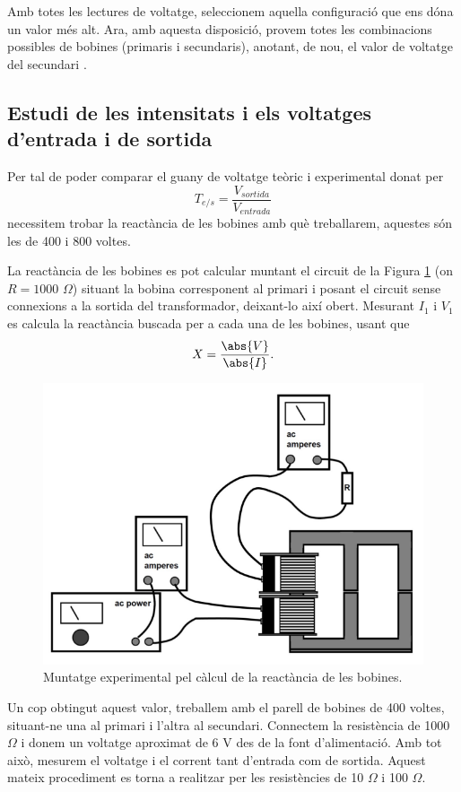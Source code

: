 \documentclass[a4paper,10.5pt]{report}
\begin{document}
Amb totes les lectures de voltatge, seleccionem aquella configuració que ens dóna un valor més alt. Ara, amb aquesta disposició, provem totes les combinacions possibles de bobines (primaris i secundaris), anotant, de nou, el valor de voltatge del secundari .

\subsection{Estudi de les intensitats i els voltatges d'entrada i de sortida}
Per tal de poder comparar el guany de voltatge teòric i experimental donat per
\begin{equation}
	T_{e/s}=\frac{V_{sortida}}{V_{entrada}}
	\label{eq4:25}
\end{equation}
necessitem trobar la reactància de les bobines amb què treballarem, aquestes són les de 400 i 800 voltes.

La reactància de les bobines es pot calcular muntant el circuit de la Figura \ref{fig4:4} (on $R=1000$ $\Omega$) situant la bobina corresponent al primari i posant el circuit sense connexions a la sortida del transformador, deixant-lo així obert. Mesurant $I_1$ i $V_1$ es calcula la reactància buscada per a cada una de les bobines, usant que
\begin{equation}
	X = \frac{\abs{V}}{\abs{I}}.
\end{equation}

\begin{figure}[h]
	\centering
	\includegraphics[width=0.4\linewidth]{screenshot010}
	\caption{Muntatge experimental pel càlcul de la reactància de les bobines.}
	\label{fig4:4}
\end{figure}

Un cop obtingut aquest valor, treballem amb el parell de bobines de 400 voltes, situant-ne una al primari i l'altra al secundari. Connectem la resistència de 1000 $\Omega$ i donem un voltatge aproximat de 6 V des de la font d'alimentació. Amb tot això, mesurem el voltatge i el corrent tant d'entrada com de sortida. Aquest mateix procediment es torna a realitzar per les resistències de 10 $\Omega$ i 100 $\Omega$.
\end{document}
